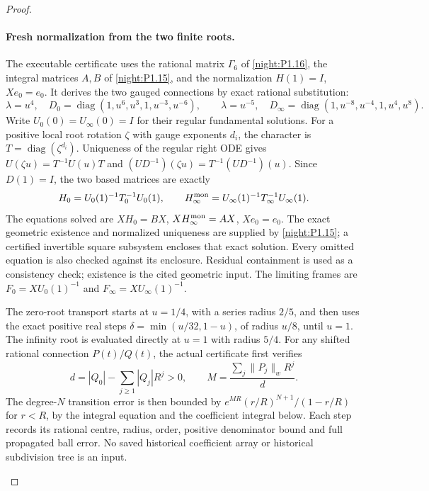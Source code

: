 \begin{proof}
\begin{enumerate}[label=\arabic*.]
\paragraph{Fresh normalization from the two finite roots.}
The executable certificate uses the rational matrix $\Gamma_6$ of
\cref{night:P1.16}, the integral matrices $A,B$ of
\cref{night:P1.15}, and the normalization $H(1)=I$, $Xe_0=e_0$.
It derives the two gauged connections by exact rational substitution:
\[
 \lambda=u^4,\quad D_0=\operatorname{diag}(1,u^6,u^3,1,u^{-3},u^{-6}),
 \qquad
 \lambda=u^{-5},\quad D_\infty=
 \operatorname{diag}(1,u^{-8},u^{-4},1,u^4,u^8).
\]
Write $U_0(0)=U_\infty(0)=I$ for their regular fundamental
solutions.  For a positive local root rotation $\zeta$ with gauge
exponents $d_i$, the character is $T=\operatorname{diag}(\zeta^{d_i})$.
Uniqueness of the regular right ODE gives
$U(\zeta u)=T^{-1}U(u)T$ and
$(UD^{-1})(\zeta u)=T^{-1}(UD^{-1})(u)$.
Since $D(1)=I$, the two based matrices are exactly
\[
 H_0=U_0(1)^{-1}T_0^{-1}U_0(1),\qquad
 H_\infty^{\rm mon}=U_\infty(1)^{-1}T_\infty^{-1}U_\infty(1).
\]
The equations solved are $XH_0=BX$, $XH_\infty^{\rm mon}=AX$,
$Xe_0=e_0$.  The exact geometric existence and normalized uniqueness
are supplied by \cref{night:P1.15}; a certified invertible square
subsystem encloses that exact solution.  Every omitted equation is
also checked against its enclosure.  Residual containment is used
as a consistency check; existence is the cited geometric input.
The limiting frames are
$F_0=XU_0(1)^{-1}$ and $F_\infty=XU_\infty(1)^{-1}$.

The zero-root transport starts at $u=1/4$, with a series radius
$2/5$, and then uses the exact positive real steps
$\delta=\min(u/32,1-u)$, of radius $u/8$, until $u=1$.
The infinity root is evaluated directly at $u=1$ with radius $5/4$.
For any shifted rational connection $P(t)/Q(t)$, the actual
certificate first verifies
\[
 d=|Q_0|-\sum_{j\ge1}|Q_j|R^j>0,\qquad
 M=\frac{\sum_j\|P_j\|_wR^j}{d}.
\]
The degree-$N$ transition error is then bounded by
$e^{MR}(r/R)^{N+1}/(1-r/R)$ for $r<R$, by the integral equation
and the coefficient integral below.  Each step records its
rational centre, radius, order, positive denominator bound and
full propagated ball error.  No saved historical coefficient
array or historical subdivision tree is an input.


\end{enumerate}
\end{proof}
